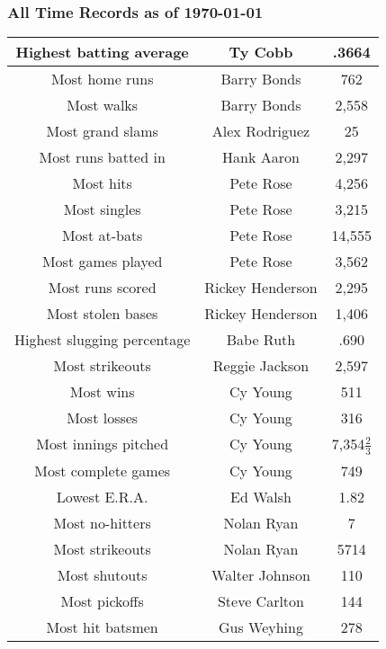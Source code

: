 \documentclass[12pt]{book}
\begin{document}
			\subsubsection{All Time Records as of \today}
			\begin{center}


				\begin{tabular}{|c|c|c|}
				\hline
					Highest batting average & Ty Cobb & .3664 \\
					\hline
					Most home runs & Barry Bonds & 762 \\
					\hline
					Most walks & Barry Bonds & 2,558 \\
					\hline
					Most grand slams & Alex Rodriguez &	25 \\
					\hline
					Most runs batted in & Hank Aaron  & 2,297 \\
					\hline
					Most hits & Pete Rose & 4,256 \\
					\hline
					Most singles & Pete Rose & 3,215 \\
					\hline
					Most at-bats & Pete Rose & 14,555 \\
					\hline
					Most games played & Pete Rose & 3,562 \\
					\hline 
					Most runs scored & Rickey Henderson & 2,295 \\
					\hline
					Most stolen bases & Rickey Henderson & 1,406 \\
					\hline
					Highest slugging percentage & Babe Ruth & .690 \\
					\hline
					Most strikeouts & Reggie Jackson & 2,597 \\
					\hline
					Most wins 	&	Cy Young 	&	511	\\
					\hline
					Most losses 	&	Cy Young 	&	316	\\
					\hline
					Most innings pitched 	&	Cy Young 	&	7,354$\frac{2}{3}$ 	\\
					\hline	
					Most complete games 	&	Cy Young 	&	749	\\				
					\hline
					Lowest E.R.A. 	&	Ed Walsh 	&	1.82	\\
					\hline
					Most no-hitters 	&	Nolan Ryan 	&	7	\\
					\hline
					Most strikeouts 	&	Nolan Ryan 	&	5714	\\
					\hline
					Most shutouts 	&	Walter Johnson 	&	110	\\
					\hline
					Most pickoffs 	&	Steve Carlton 	&	144	\\
					\hline
					Most hit batsmen 	&	Gus Weyhing 	&	278	\\

\end{tabular}
\end{center}
\end{document}
